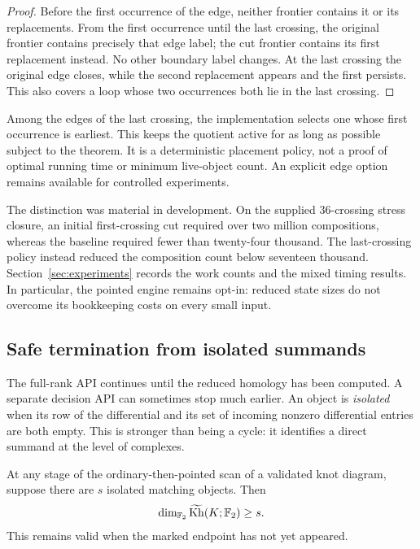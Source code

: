 \begin{proof}
Before the first occurrence of the edge, neither frontier contains it or
its replacements.  From the first occurrence until the last crossing, the
original frontier contains precisely that edge label; the cut frontier
contains its first replacement instead.  No other boundary label changes.
At the last crossing the original edge closes, while the second replacement
appears and the first persists.  This also covers a loop whose two
occurrences both lie in the last crossing.
\end{proof}

Among the edges of the last crossing, the implementation selects one whose
first occurrence is earliest.  This keeps the quotient active for as long
as possible subject to the theorem.  It is a deterministic placement policy,
not a proof of optimal running time or minimum live-object count.  An
explicit edge option remains available for controlled experiments.

The distinction was material in development.  On the supplied 36-crossing
stress closure, an initial first-crossing cut required over two million
compositions, whereas the baseline required fewer than twenty-four thousand.
The last-crossing policy instead reduced the composition count below
seventeen thousand.  Section~\ref{sec:experiments} records the work counts
and the mixed timing results.  In particular, the pointed engine remains
opt-in: reduced state sizes do not overcome its bookkeeping costs on every
small input.

\subsection{Safe termination from isolated summands}

The full-rank API continues until the reduced homology has been computed.
A separate decision API can sometimes stop much earlier.  An object is
\emph{isolated} when its row of the differential and its set of incoming
nonzero differential entries are both empty.  This is stronger than being
a cycle: it identifies a direct summand at the level of complexes.

\begin{theorem}
\label{thm:isolatedbound}
At any stage of the ordinary-then-pointed scan of a validated knot diagram,
suppose there are $s$ isolated matching objects.  Then
\[
 \dim_{\mathbb{F}_2}\widetilde{\operatorname{Kh}}(K;\mathbb{F}_2)\geq s.
\]
This remains valid when the marked endpoint has not yet appeared.
\end{theorem}

